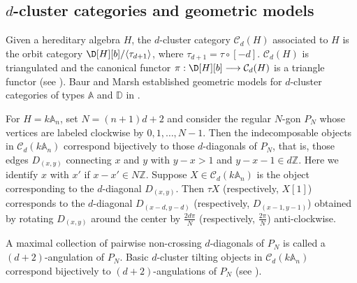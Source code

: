 \documentclass[12pt]{article}
\theoremstyle{plain}
\theoremstyle{definition}
\newcommand{\Db}[1][]{\D[#1][b]}
\newcommand{\lra}{\longrightarrow}
\begin{document}
\subsection{$d$-cluster categories and geometric models}
\label{subsec-geometric-model}

Given a hereditary algebra $H$, the $d$-cluster category $\mathcal{C}_d(H)$ associated to $H$ is the orbit category $\Db[H]/\langle\tau_{d+1}\rangle$, where $\tau_{d+1}=\tau\circ[-d]$. $\mathcal{C}_d(H)$ is triangulated and the canonical functor \(\pi:\Db[H]\lra\mathcal{C}_d(H)\) is a triangle functor (see \cite{Keller2005ab}).  Baur and Marsh established geometric models for $d$-cluster categories of  types  $\mathbb{A}$ and $\mathbb{D}$ in  \cite{Baur2007,Baur2008}.   




For $H=k\mathbb{A}_{n}$,  set \(N=(n+1)d+2\) and consider the regular $N$-gon $P_N$ whose vertices are labeled clockwise by $0, 1, \ldots, N-1$. Then the indecomposable objects in $\mathcal{C}_d(k\mathbb{A}_n)$ correspond bijectively to those $d$-diagonals of $P_N$, that is, those edges $D_{(x,y)}$ connecting $x$ and $y$ with $y-x>1$ and $y-x-1\in d\mathbb{Z}$. Here we identify $x$ with $x'$ if $x-x'\in N\mathbb{Z}$. Suppose $X\in\mathcal{C}_d(k\mathbb{A}_n)$ is the object corresponding to the $d$-diagonal $D_{(x,y)}$. Then $\tau X$ (respectively, $X[1]$) corresponds to the $d$-diagonal $D_{(x-d,y-d)}$ (respectively, $D_{(x-1,y-1)}$) obtained by rotating $D_{(x,y)}$ around the center by $\frac{2d\pi}{N}$ (respectively, $\frac{2\pi}{N}$) anti-clockwise.  




A maximal collection of pairwise non-crossing  $d$-diagonals of $P_{N}$ is called a  $(d+2)$-angulation of $P_{N}$.  Basic $d$-cluster tilting objects in $\mathcal{C}_d(k\mathbb{A}_n)$ correspond bijectively to $(d+2)$-angulations of $P_N$ (see \cite{Thomas2007,Zhu2008}). 
\end{document}
